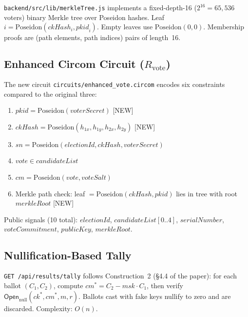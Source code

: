 \documentclass[conference]{IEEEtran}
\begin{document}
\texttt{backend/src/lib/merkleTree.js} implements a fixed-depth-16
($2^{16} = 65{,}536$ voters) binary Merkle tree over Poseidon hashes.
Leaf $i = \mathrm{Poseidon}(\mathit{ckHash}_i, \mathit{pkid}_i)$.
Empty leaves use $\mathrm{Poseidon}(0,0)$.  Membership proofs are (path
elements, path indices) pairs of length~16.

\subsection{Enhanced Circom Circuit ($R_{\text{vote}}$)}
\label{sec:circuit}

The new circuit \texttt{circuits/enhanced\_vote.circom} encodes six constraints
compared to the original three:

\begin{enumerate}
  \item $\mathit{pkid} = \mathrm{Poseidon}(\mathit{voterSecret})$ \hfill [NEW]
  \item $\mathit{ckHash} = \mathrm{Poseidon}(h_{1x}, h_{1y}, h_{2x}, h_{2y})$ \hfill [NEW]
  \item $\mathit{sn} = \mathrm{Poseidon}(\mathit{electionId}, \mathit{ckHash}, \mathit{voterSecret})$
  \item $\mathit{vote} \in \mathit{candidateList}$
  \item $\mathit{cm} = \mathrm{Poseidon}(\mathit{vote}, \mathit{voteSalt})$
  \item Merkle path check: leaf $= \mathrm{Poseidon}(\mathit{ckHash}, \mathit{pkid})$
    lies in tree with root $\mathit{merkleRoot}$ \hfill [NEW]
\end{enumerate}

Public signals (10 total): $\mathit{electionId}$, $\mathit{candidateList}[0..4]$,
$\mathit{serialNumber}$, $\mathit{voteCommitment}$, $\mathit{publicKey}$,
$\mathit{merkleRoot}$.

\subsection{Nullification-Based Tally}

\texttt{GET /api/results/tally} follows Construction~2 (§4.4 of the paper):
for each ballot $(C_1, C_2)$, compute $\mathit{cm}^* = C_2 - \mathit{msk}\cdot C_1$,
then verify $\mathsf{Open}_{\mathrm{null}}(\mathit{ck}^*, \mathit{cm}^*, m, r)$.
Ballots cast with fake keys nullify to zero and are discarded.  Complexity: $O(n)$.

\end{document}
